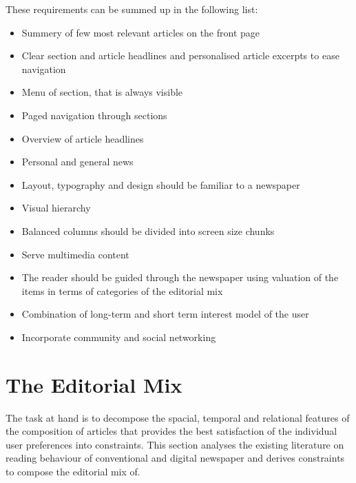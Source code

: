 These requirements can be summed up in the following list:
\begin{itemize}\itemdist
	\item Summery of few most relevant articles on the front page
	\item Clear section and article headlines and personalised article excerpts to ease navigation
	\item Menu of section, that is always visible
	\item Paged navigation through sections
	\item Overview of article headlines
	\item Personal and general news
	\item Layout, typography and design should be familiar to a newspaper
	\item Visual hierarchy
	\item Balanced columns should be divided into screen size chunks
	\item Serve multimedia content
	\item The reader should be guided through the newspaper using valuation of the items in terms of categories of the editorial mix
	\item Combination of long-term and short term interest model of the user
	\item Incorporate community and social networking
\end{itemize}

\section{The Editorial Mix}%
The task at hand is to decompose the spacial, temporal and relational features of the composition of articles that provides the best satisfaction of the individual user preferences into constraints. This section analyses the existing literature on reading behaviour of conventional and digital newspaper and derives constraints to compose the editorial mix of.

